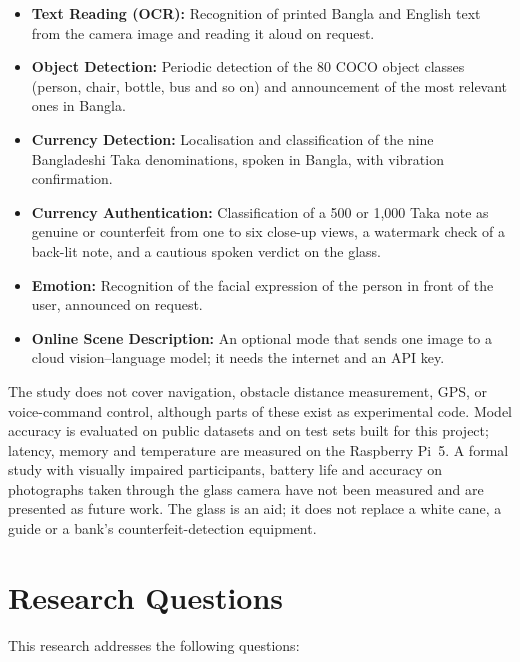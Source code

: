 \begin{itemize}
    \item \textbf{Text Reading (OCR):} Recognition of printed Bangla and English text from the camera image and reading it aloud on request.

    \item \textbf{Object Detection:} Periodic detection of the 80 COCO object classes (person, chair, bottle, bus and so on) and announcement of the most relevant ones in Bangla.

    \item \textbf{Currency Detection:} Localisation and classification of the nine Bangladeshi Taka denominations, spoken in Bangla, with vibration confirmation.

    \item \textbf{Currency Authentication:} Classification of a 500 or 1,000 Taka note as genuine or counterfeit from one to six close-up views, a watermark check of a back-lit note, and a cautious spoken verdict on the glass.

    \item \textbf{Emotion:} Recognition of the facial expression of the person in front of the user, announced on request.

    \item \textbf{Online Scene Description:} An optional mode that sends one image to a cloud vision--language model; it needs the internet and an API key.
\end{itemize}

The study does not cover navigation, obstacle distance measurement, GPS, or voice-command control, although parts of these exist as experimental code. Model accuracy is evaluated on public datasets and on test sets built for this project; latency, memory and temperature are measured on the Raspberry Pi~5. A formal study with visually impaired participants, battery life and accuracy on photographs taken through the glass camera have not been measured and are presented as future work. The glass is an aid; it does not replace a white cane, a guide or a bank's counterfeit-detection equipment.


\section{Research Questions}
\label{sec:Research Question}

This research addresses the following questions:

